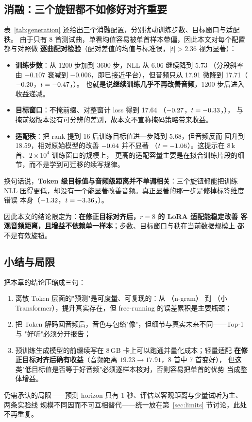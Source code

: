 \subsection{消融：三个旋钮都不如修好对齐重要}\label{sec:p2loraabl}

表~\ref{tab:generation} 还给出三个消融配置，分别扰动训练步数、目标窗口与适配秩。
由于只有 8 首测试曲，单看均值容易被单首样本带偏，因此本文对每个配置都与对照做
\textbf{逐曲配对检验}（配对差值的均值与标准误，$|t|>2.36$ 视为显著）：

\begin{itemize}
  \item \textbf{训练步数}：从 1200 步加到 3600 步，NLL 从 6.06 继续降到 5.73
        （分段斜率由 $-0.107$ 衰减到 $-0.006$，即已接近平台），但音频只从 17.91
        微降到 17.71（$-0.20$，$t=-0.47$，\GenVThreeVsFtSig）。
        也就是说\textbf{继续训练几乎不再改善音频}，1200 步后进入收益递减。
  \item \textbf{目标窗口}：不掩前缀、对整窗计 loss 得到 17.64
        （$-0.27$，$t=-0.33$，\GenFullVsFtSig），
        与掩前缀版本没有可分辨的差别，故本文不宣称掩码策略带来收益。
  \item \textbf{适配秩}：把 rank 提到 16 后训练目标值进一步降到 5.68，但音频反而
        回升到 18.59，相对原始模型的改善 $-0.64$ 并不显著
        （$t=-1.06$）。这提示在 8\,k 首、$2\times10^4$ 训练窗口的规模上，
        更高的适配容量主要是在拟合训练片段的细节，而不是学到可迁移的续写规律。
\end{itemize}

换句话说，\textbf{Token 级目标值与音频级距离并不单调相关}：三个旋钮都能把训练
NLL 压得更低，却没有一个能显著改善音频。真正显著的那一步是修掉标签维度错误
本身（$-1.32$，$t=-3.36$，\GenFtVsBaseSig）。

因此本文的结论限定为：\textbf{在修正目标对齐后，$r{=}8$ 的 LoRA 适配能稳定改善
客观音频距离，且增益不依赖单一样本}；步数、目标窗口与秩在当前数据规模上
都不是有效旋钮。

\subsection{小结与局限}\label{sec:p2limit}

把本章的结论压缩成三句：

\begin{enumerate}
  \item 离散 Token 层面的"预测"是可度量、可复现的：从 \TokBigramFree{}（n-gram）
        到 \TokTransformerFree{}（小 Transformer），提升真实存在，但 free-running
        的误差累积是主要瓶颈；
  \item 把 Token 解码回音频后，音色与包络"像"，但细节与真实未来不同——Top-1 与
        "好听"必须分开报告；
  \item 预训练生成模型的前缀续写在 8\,GB 卡上可以跑通并量化成本；轻量适配
        \textbf{在修正目标对齐后确有收益}（音频距离 $19.23\to17.91$，8 首中 7 首变好），
        但这类"低目标值是否等于好音频"必须逐样本核对，否则容易把单首的优势
        当成整体增益。
\end{enumerate}

仍需承认的局限——预测 horizon 只有 1 秒、评估以客观距离与少量试听为主、两条实验线
规模不同因而不可互相替代——统一放在第~\ref{sec:limits} 节讨论，此处不再重复。

